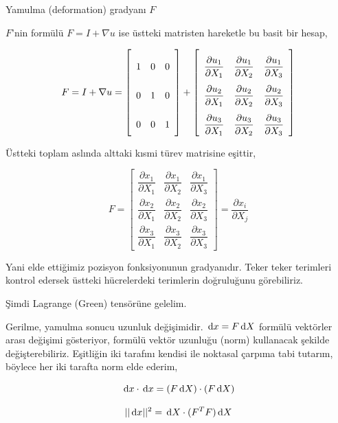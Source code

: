 \documentclass[12pt,fleqn]{article}\usepackage{../../common}
\begin{document}
Yamulma (deformation) gradyanı $F$

$F$'nin formülü $F = I + \nabla u$ ise üstteki matristen hareketle bu basit
bir hesap,

$$
F = I + \nabla u = 
\left[\begin{array}{ccc}
1 & 0 & 0 \\ 0 & 1 & 0 \\ 0 & 0 & 1
\end{array}\right] + 
\renewcommand*{\arraystretch}{2.5}
\left[\begin{array}{ccc}
\dfrac{\partial u_1}{\partial X_1} & \dfrac{\partial u_1}{\partial X_2} & \dfrac{\partial u_1}{\partial X_3} \\
\dfrac{\partial u_2}{\partial X_1} & \dfrac{\partial u_2}{\partial X_2} & \dfrac{\partial u_2}{\partial X_3} \\
\dfrac{\partial u_3}{\partial X_1} & \dfrac{\partial u_3}{\partial X_2} & \dfrac{\partial u_3}{\partial X_3} 
\end{array}\right]
$$

Üstteki toplam aslında alttaki kısmi türev matrisine eşittir,

$$
\renewcommand*{\arraystretch}{2.5}
F = \left[\begin{array}{ccc}
\dfrac{\partial x_1}{\partial X_1} & \dfrac{\partial x_1}{\partial X_2} & \dfrac{\partial x_1}{\partial X_3} \\
\dfrac{\partial x_2}{\partial X_1} & \dfrac{\partial x_2}{\partial X_2} & \dfrac{\partial x_2}{\partial X_3} \\
\dfrac{\partial x_3}{\partial X_1} & \dfrac{\partial x_3}{\partial X_2} & \dfrac{\partial x_3}{\partial X_3} 
\end{array}\right] =
\frac{\partial x_i}{\partial X_j}
$$

Yani elde ettiğimiz pozisyon fonksiyonunun gradyanıdır. Teker teker terimleri
kontrol edersek üstteki hücrelerdeki terimlerin doğruluğunu görebiliriz.

Şimdi Lagrange (Green) tensörüne gelelim.

Gerilme, yamulma sonucu uzunluk değişimidir. $\,\mathrm{d} x = F \,\mathrm{d} X$ formülü vektörler
arası değişimi gösteriyor, formülü vektör uzunluğu (norm) kullanacak şekilde
değişterebiliriz. Eşitliğin iki tarafını kendisi ile noktasal çarpıma tabi
tutarım, böylece her iki tarafta norm elde ederim,

$$
\,\mathrm{d} x \cdot \,\mathrm{d} x  = (F \,\mathrm{d} X) \cdot (F \,\mathrm{d} X)
$$

$$
||\,\mathrm{d} x||^2  = \,\mathrm{d} X \cdot (F^T F) \,\mathrm{d} X
$$
\end{document}

